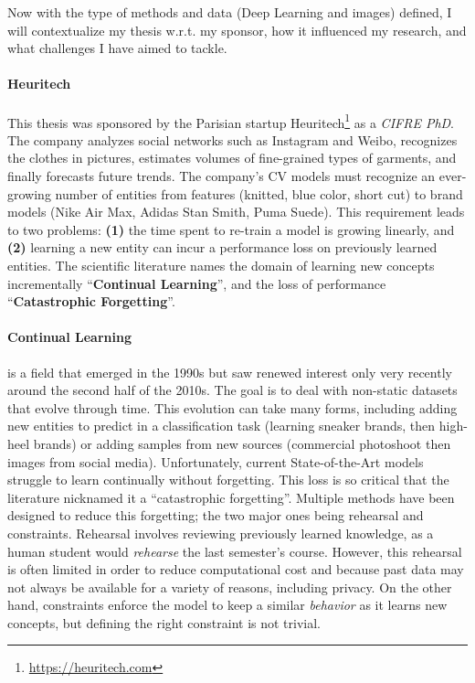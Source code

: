 Now with the type of methods and data (Deep Learning and images) defined, I will contextualize my
thesis w.r.t. my sponsor, how it influenced my research, and what challenges I have aimed to tackle.

\paragraph{Heuritech} This thesis was sponsored by the Parisian startup
Heuritech\footnote{\url{https://heuritech.com}} as a \textit{CIFRE PhD}. The company analyzes social
networks such as Instagram and Weibo, recognizes the clothes in pictures, estimates
volumes of fine-grained types of garments, and finally forecasts future trends. The company's
\acf{CV} models must recognize an ever-growing number of entities from features (\eg knitted, blue
color, short cut) to brand models (\eg Nike Air Max, Adidas Stan Smith, Puma Suede). This
requirement leads to two problems: \textbf{(1)} the time spent to re-train a model is growing
linearly, and \textbf{(2)} learning a new entity can incur a performance loss on previously learned
entities. The scientific literature names the domain of learning new concepts incrementally
``\textbf{Continual Learning}'', and the loss of performance ``\textbf{Catastrophic Forgetting}''.

\paragraph{Continual Learning} is a field that emerged in the 1990s but saw renewed interest only
very recently around the second half of the 2010s. The goal is to deal with non-static datasets that
evolve through time. This evolution can take many forms, including adding new entities to predict in
a classification task (\eg learning sneaker brands, then high-heel brands) or adding samples from
new sources (\eg commercial photoshoot then images from social media). Unfortunately, current
State-of-the-Art models struggle to learn continually without forgetting. This loss is so critical
that the literature nicknamed it a ``catastrophic forgetting''. Multiple methods have been designed
to reduce this forgetting; the two major ones being rehearsal and constraints. Rehearsal involves
reviewing previously learned knowledge, as a human student would \textit{rehearse} the last
semester's course. However, this rehearsal is often limited in order to reduce computational cost
and because past data may not always be available for a variety of reasons, including privacy. On
the other hand, constraints enforce the model to keep a similar \textit{behavior} as it learns new
concepts, but defining the right constraint is not trivial.


